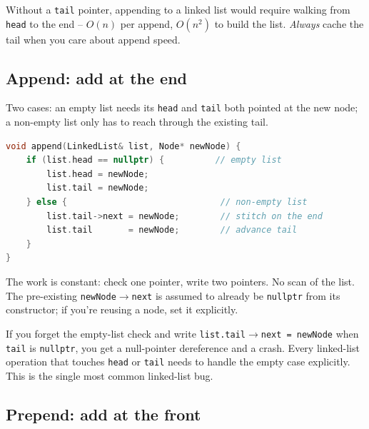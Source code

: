 \documentclass[11pt]{article}
\begin{document}
\begin{warnbox}
Without a \texttt{tail} pointer, appending to a linked list would
require walking from \texttt{head} to the end -- $O(n)$ per append,
$O(n^2)$ to build the list. \emph{Always} cache the tail when you
care about append speed.
\end{warnbox}

\subsection{Append: add at the end}

Two cases: an empty list needs its \texttt{head} and \texttt{tail}
both pointed at the new node; a non-empty list only has to reach
through the existing tail.

\begin{examplebox}
\begin{lstlisting}[basicstyle=\ttfamily\small,frame=single,language=C++]
void append(LinkedList& list, Node* newNode) {
    if (list.head == nullptr) {          // empty list
        list.head = newNode;
        list.tail = newNode;
    } else {                              // non-empty list
        list.tail->next = newNode;        // stitch on the end
        list.tail       = newNode;        // advance tail
    }
}
\end{lstlisting}
\end{examplebox}

\begin{ideabox}
The work is constant: check one pointer, write two pointers. No
scan of the list. The pre-existing \texttt{newNode$\to$next} is
assumed to already be \texttt{nullptr} from its constructor; if
you're reusing a node, set it explicitly.
\end{ideabox}

\begin{warnbox}
If you forget the empty-list check and write
\texttt{list.tail$\to$next = newNode} when \texttt{tail} is
\texttt{nullptr}, you get a null-pointer dereference and a crash.
Every linked-list operation that touches \texttt{head} or
\texttt{tail} needs to handle the empty case explicitly. This is
the single most common linked-list bug.
\end{warnbox}

\subsection{Prepend: add at the front}
\end{document}
